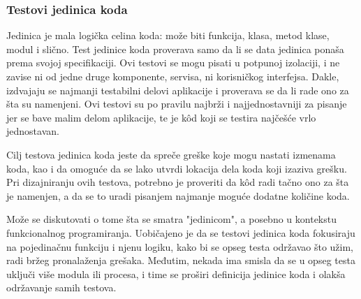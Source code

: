 \documentclass[12pt,oneside]{memoir}
\begin{document}
\subsubsection{Testovi jedinica koda}
\par Jedinica je mala logička celina koda: može biti funkcija, klasa, metod klase, modul i slično. Test jedinice koda proverava samo da li se data jedinica ponaša prema svojoj specifikaciji. Ovi testovi se mogu pisati u potpunoj izolaciji, i ne zavise ni od jedne druge komponente, servisa, ni korisničkog interfejsa. Dakle, izdvajaju se najmanji testabilni delovi aplikacije i proverava se da li rade ono za šta su namenjeni. Ovi testovi su po pravilu najbrži i  najjednostavniji za pisanje jer se bave malim delom aplikacije, te je k\^{o}d koji se testira najčešće vrlo jednostavan. 
\par Cilj testova jedinica koda jeste da spreče greške koje mogu nastati izmenama koda, kao i da omoguće da se lako utvrdi lokacija dela koda koji izaziva grešku. Pri dizajniranju ovih testova, potrebno je proveriti da k\^{o}d radi tačno ono za šta je namenjen, a da se to uradi pisanjem najmanje moguće dodatne količine koda.
\par Može se diskutovati o tome šta se smatra "jedinicom", a posebno u kontekstu funkcionalnog programiranja. Uobičajeno je da se testovi jedinica koda fokusiraju na pojedinačnu funkciju i njenu logiku, kako bi se opseg testa održavao što užim, radi bržeg pronalaženja grešaka. Međutim, nekada ima smisla da se u opseg testa uključi više modula ili procesa, i time se proširi definicija jedinice koda i olakša održavanje samih testova. 
\end{document}

